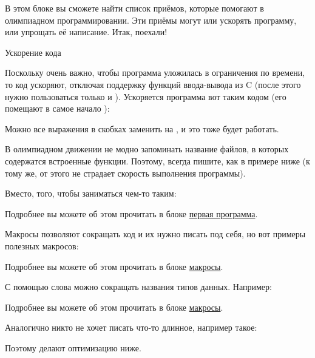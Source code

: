 \hypertarget{1.0}{}
В этом блоке вы сможете найти список приёмов, которые помогают в олимпиадном программировании. Эти приёмы могут или ускорять программу, или упрощать её написание. Итак, поехали!


\startspace
Ускорение кода
\endspace

Поскольку очень важно, чтобы программа уложилась в ограничения по времени, то код ускоряют, отключая поддержку функций ввода-вывода из C (после этого нужно пользоваться только  и ). Ускоряется программа вот таким кодом (его помещают в самое начало ):


Можно все выражения в скобках заменить на , и это тоже будет работать.


\startspace
{}
\endspace

В олимпиадном движении не модно запоминать название файлов, в которых содержатся встроенные функции. Поэтому, всегда пишите, как в примере ниже (к тому же, от этого не страдает скорость выполнения программы).


Вместо, того, чтобы заниматься чем-то таким:


Подробнее вы можете об этом прочитать в блоке \hyperlink{1.1}{первая программа}.


\startspace
{}
\endspace

Макросы позволяют сокращать код и их нужно писать под себя, но вот примеры полезных макросов:


Подробнее вы можете об этом прочитать в блоке \hyperlink{macros}{макросы}.


\startspace
{}
\endspace

С помощью слова  можно сокращать названия типов данных. Например:


Подробнее вы можете об этом прочитать в блоке \hyperlink{macros}{макросы}.


\startspace
{}
\endspace

Аналогично никто не хочет писать что-то длинное, например такое:


Поэтому делают оптимизацию ниже.

